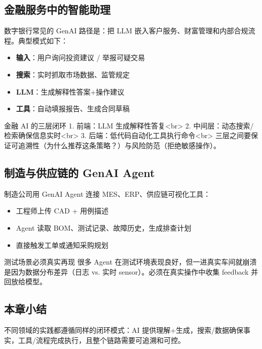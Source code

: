 \documentclass[a4paper]{article}
\begin{document}
\subsection{金融服务中的智能助理}

数字银行常见的 GenAI 路径是：把 LLM 嵌入客户服务、财富管理和内部合规流程。典型模式如下：

\begin{itemize}
    \item \textbf{输入}：用户询问投资建议 / 举报可疑交易
    \item \textbf{搜索}：实时抓取市场数据、监管规定
    \item \textbf{LLM}：生成解释性答案+操作建议
    \item \textbf{工具}：自动填报报告、生成合同草稿
\end{itemize}

\begin{knowledgebox}{金融 AI 的三层闭环}
1. 前端：LLM 生成解释性答复<br>
2. 中间层：动态搜索/检索确保信息实时<br>
3. 后端：低代码自动化工具执行命令<br>
三层之间要保证可追溯性（为什么推荐这条策略？）与风险防范（拒绝敏感操作）。
\end{knowledgebox}

\subsection{制造与供应链的 GenAI Agent}

制造公司用 GenAI Agent 连接 MES、ERP、供应链可视化工具：

\begin{itemize}
    \item 工程师上传 CAD + 用例描述
    \item Agent 读取 BOM、测试记录、故障历史，生成排查计划
    \item 直接触发工单或通知采购规划
\end{itemize}

\begin{warningbox}{测试场景必须真实再现}
很多 Agent 在测试环境表现良好，但一进真实车间就崩溃是因为数据分布差异（日志 vs. 实时 sensor）。必须在真实操作中收集 feedback 并回放给模型。
\end{warningbox}

\subsection{本章小结}

不同领域的实践都遵循同样的闭环模式：AI 提供理解+生成，搜索/数据确保事实，工具/流程完成执行，且整个链路需要可追溯和可控。
\end{document}
